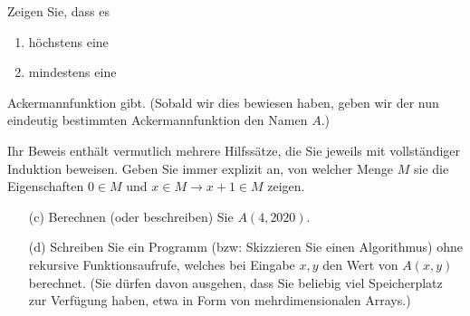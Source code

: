 
\begin{exercise}[207]

Zeigen Sie, dass es
\begin{enumerate}[label = (\alph*)]
	\item höchstens eine
	\item mindestens eine
\end{enumerate}
Ackermannfunktion gibt. (Sobald wir dies bewiesen haben, geben wir der nun eindeutig
bestimmten Ackermannfunktion den Namen $A$.)


Ihr Beweis enthält vermutlich mehrere Hilfssätze, die Sie jeweils mit vollständiger
Induktion beweisen. Geben Sie immer explizit an, von welcher Menge $M$ sie die
Eigenschaften $0 \in M$ und $x \in M \rightarrow x + 1 \in M$ zeigen.
\begin{itemize}
	\item[(c)] Berechnen (oder beschreiben) Sie $A(4,2020)$.
	\item[(d)] Schreiben Sie ein Programm (bzw: Skizzieren Sie einen Algorithmus)
	ohne rekursive Funktionsaufrufe, welches bei Eingabe $x,y$ den Wert von $A(x,y)$
	berechnet. (Sie dürfen davon ausgehen, dass Sie beliebig viel Speicherplatz zur
	Verfügung haben, etwa in Form von mehrdimensionalen Arrays.)
\end{itemize}
\end{exercise}


